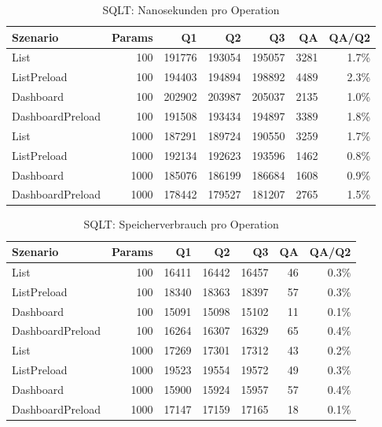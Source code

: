 
\begin{table}[ht]
\caption{SQLT: Nanosekunden pro Operation}
\begin{tabular}{lrrrrrr}
\toprule
Szenario & Params & Q1 & Q2 & Q3 & QA & QA/Q2 \\
\midrule
	List & 100 & 191776 & 193054 & 195057 & 3281 & 1.7\% \\
	ListPreload & 100 & 194403 & 194894 & 198892 & 4489 & 2.3\% \\
	Dashboard & 100 & 202902 & 203987 & 205037 & 2135 & 1.0\% \\
	DashboardPreload & 100 & 191508 & 193434 & 194897 & 3389 & 1.8\% \\
	List & 1000 & 187291 & 189724 & 190550 & 3259 & 1.7\% \\
	ListPreload & 1000 & 192134 & 192623 & 193596 & 1462 & 0.8\% \\
	Dashboard & 1000 & 185076 & 186199 & 186684 & 1608 & 0.9\% \\
	DashboardPreload & 1000 & 178442 & 179527 & 181207 & 2765 & 1.5\% \\
\bottomrule
\end{tabular}
\label{tab:benchmark_sqlt_nsperop}
\end{table}
	
\begin{table}[ht]
\caption{SQLT: Speicherverbrauch pro Operation}
\begin{tabular}{lrrrrrr}
\toprule
Szenario & Params & Q1 & Q2 & Q3 & QA & QA/Q2 \\
\midrule
	List & 100 & 16411 & 16442 & 16457 & 46 & 0.3\% \\
	ListPreload & 100 & 18340 & 18363 & 18397 & 57 & 0.3\% \\
	Dashboard & 100 & 15091 & 15098 & 15102 & 11 & 0.1\% \\
	DashboardPreload & 100 & 16264 & 16307 & 16329 & 65 & 0.4\% \\
	List & 1000 & 17269 & 17301 & 17312 & 43 & 0.2\% \\
	ListPreload & 1000 & 19523 & 19554 & 19572 & 49 & 0.3\% \\
	Dashboard & 1000 & 15900 & 15924 & 15957 & 57 & 0.4\% \\
	DashboardPreload & 1000 & 17147 & 17159 & 17165 & 18 & 0.1\% \\
\bottomrule
\end{tabular}
\label{tab:benchmark_sqlt_bytesperop}
\end{table}
	

